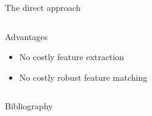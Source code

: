 \documentclass[10pt]{beamer}
\begin{document}
\begin{frame}{The direct approach}
\begin{columns}
\begin{column}{0.5\textwidth}
		\end{column}
	\end{columns}
	\begin{columns}
		\begin{column}{0.9\textwidth}
			\begin{block}{Advantages}
				\begin{itemize}
					\item No costly feature extraction
					\item No costly robust feature matching
				\end{itemize}
			\end{block}
		\end{column}
		\begin{column}{0.1\textwidth}
		\end{column}
	\end{columns}	

		
	  
\end{frame}


\begin{frame}{Bibliography}
	
	
\end{frame}
\end{document}
